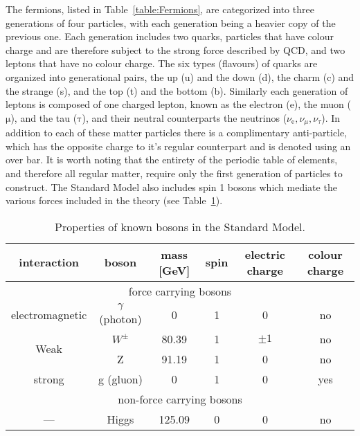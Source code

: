 The fermions, listed in Table~\ref{table:Fermions}, are categorized into three generations of four particles, with each generation being a heavier copy of the previous one.  
Each generation includes two quarks, particles that have colour charge and are therefore subject to the strong force described by \gls{QCD}, and two leptons that have no colour charge.  
The six types (flavours) of quarks are organized into generational pairs, the up (u) and the down (d), the charm (c) and the strange (s), and the top (t) and the bottom (b).  
Similarly each generation of leptons is composed of one charged lepton, known as the electron (e), the muon ($\mathrm{\mu}$), and the tau ($\mathrm{\tau}$), and their neutral counterparts the neutrinos ($\nu_{\mathrm{e}}, \nu_{\mu}, \nu_{\tau}$).  
In addition to each of these matter particles there is a complimentary anti-particle, which has the opposite charge to it's regular counterpart and is denoted using an over bar.  
It is worth noting that the entirety of the periodic table of elements, and therefore all regular matter, require only the first generation of particles to construct.  
The Standard Model also includes spin 1 bosons which mediate the various forces included in the theory (see Table~\ref{table:Bosons}). 

\begin{table}
  \centering
  \begin{tabular}{ |c|c|c|c|c|c|}
  \hline
  interaction     & boson             & mass [GeV] & spin & electric charge &  colour charge \\ \hline
  \multicolumn{6}{|c|}{force carrying bosons} \\ \hline
  electromagnetic & $\gamma$ (photon) & 0          & 1 & 0 & no \\ \hline
  \multirow{2}{*}{Weak} & $W^{\pm}$ & 80.39 & 1 & $\pm1$ & no  \\ 
                        & Z & 91.19 & 1 & 0 & no \\ \hline
  strong & g (gluon) & 0 & 1 & 0 & yes \\ \hline 
  \multicolumn{6}{|c|}{non-force carrying bosons} \\ \hline
  --- & Higgs & 125.09 & 0 & 0 & no \\ \hline
  \end{tabular}
  \caption[Properties of known bosons in the Standard Model.]
        {\small Properties of known bosons in the Standard Model.}
\label{table:Bosons}
\end{table}




